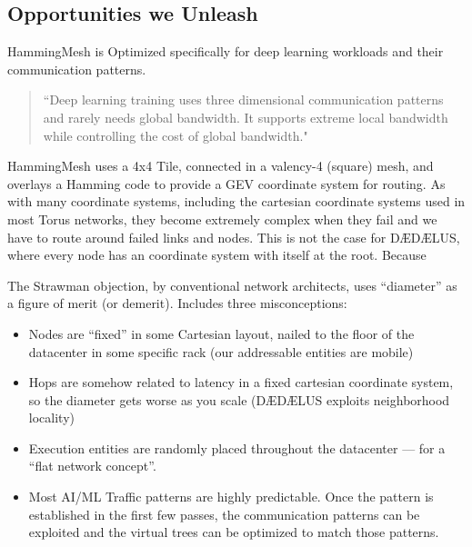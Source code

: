 \subsection{Opportunities we Unleash}

HammingMesh is Optimized specifically for deep learning workloads and their communication patterns.

\begin{quote}
“Deep learning training uses three dimensional communication patterns and rarely needs global bandwidth. It supports extreme local bandwidth while controlling the cost of global bandwidth."
\end{quote}

HammingMesh uses a 4x4 Tile, connected in a valency-4 (square) mesh, and overlays a Hamming code to provide a GEV coordinate system for routing.  As with many coordinate systems, including the cartesian coordinate systems used in most Torus networks, they become extremely complex when they fail and we have to route around failed links and nodes.  This is not the case for DÆDÆLUS, where every node has an  coordinate system with itself at the root. Because 

The Strawman objection, by conventional network architects, uses “diameter” as a figure of merit (or demerit). Includes three misconceptions:
\begin{itemize}
  \item Nodes are “fixed” in some Cartesian layout, nailed to the floor of the datacenter in some specific rack (our addressable entities are mobile)
  \item Hops are somehow related to latency in a fixed cartesian coordinate system, so the diameter gets worse as you scale (DÆDÆLUS exploits neighborhood locality)
  \item Execution entities are randomly placed throughout the datacenter — for a “flat network concept”. %
  \item Most AI/ML Traffic patterns are highly predictable. Once the pattern is established in the first few passes, the communication patterns can be exploited and the virtual trees can be optimized to match those patterns.
\end{itemize}

